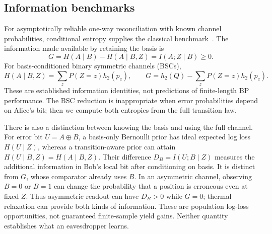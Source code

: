 \subsection{Information benchmarks}\label{app:information}
For asymptotically reliable one-way reconciliation with known channel probabilities,
conditional entropy supplies the classical benchmark~\cite{slepian1973,elkouss2011}.
The information made available by retaining the basis is
\begin{equation}
 G=H(A\mid B)-H(A\mid B,Z)=I(A;Z\mid B)\geq0.
 \label{eq:information}
\end{equation}
For basis-conditioned binary symmetric channels (BSCs),
\begin{equation}
 H(A\mid B,Z)=\sum_z P(Z=z)h_2(p_z),\qquad
 G=h_2(Q)-\sum_z P(Z=z)h_2(p_z).
 \label{eq:mixtureentropy}
\end{equation}
These are established information identities, not predictions of finite-length BP
performance. The BSC reduction is inappropriate when error probabilities depend
on Alice's bit; then we compute both entropies from the full transition law.

There is also a distinction between knowing the basis and using the full channel.
For error bit $U=A\oplus B$, a basis-only Bernoulli prior has ideal expected
log loss $H(U\mid Z)$, whereas a transition-aware prior can attain
$H(U\mid B,Z)=H(A\mid B,Z)$. Their difference
$D_B=I(U;B\mid Z)$ measures the additional information in Bob's local bit after
conditioning on basis. It is distinct from $G$, whose comparator already uses $B$.
In an asymmetric channel, observing $B=0$ or $B=1$ can change the probability
that a position is erroneous even at fixed $Z$. Thus asymmetric readout can
have $D_B>0$ while $G=0$; thermal relaxation can provide both kinds of information.
These are population log-loss opportunities, not guaranteed finite-sample yield gains.
Neither quantity establishes what an eavesdropper learns.

